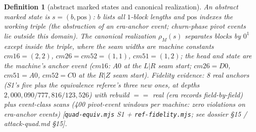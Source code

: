 \documentclass[11pt]{amsart}
\newtheorem{definition}[theorem]{Definition}
\begin{document}
\begin{definition}[abstract marked states and canonical realization]\label{def:abstract}
An abstract marked state is $s=(b,\mathrm{pos})$: $b$ lists all $1$-block lengths and $\mathrm{pos}$ indexes the working triple (the abstraction of an \emph{era-anchor event}; churn-phase pivot events lie outside this domain). The canonical realization $\rho_M(s)$ separates blocks by $0^1$ except inside the triple, where the seam widths are machine constants $cm16{=}(2,2)$, $cm26{=}cm52{=}(1,1)$, $cm51{=}(1,2)$; the head and state are the machine's anchor event ($cm16$: $A0$ at the $L|R$ seam start; $cm26{=}D0$, $cm51{=}A0$, $cm52{=}C0$ at the $R|Z$ seam start). Fidelity evidence: 8 real anchors (S1's five plus the equivalence referee's three new ones, at depths $2{,}000{,}090/777{,}816/123{,}526$) with rebuild $==$ real (era records field-by-field) plus event-class scans (400 pivot-event windows per machine: zero violations on era-anchor events) [\texttt{quad-equiv.mjs} S1 + \texttt{ref-fidelity.mjs}; see dossier \S15 / attack-quad.md \S15].
\end{definition}
\end{document}
